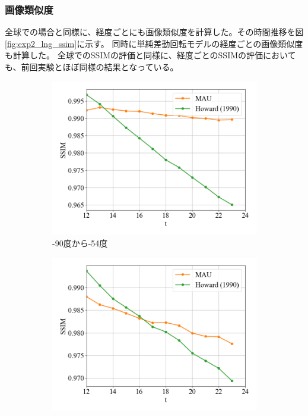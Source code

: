        \subsubsection{画像類似度}
          全球での場合と同様に、経度ごとにも画像類似度を計算した。その時間推移を図\ref{fig:exp2_lng_ssim}に示す。
          同時に単純差動回転モデルの経度ごとの画像類似度も計算した。
          全球でのSSIMの評価と同様に、経度ごとのSSIMの評価においても、前回実験とほぼ同様の結果となっている。
          \begin{figure}[htbp]
            \begin{subfigure}{0.5\textwidth}
              \centering
              \includegraphics[width=\textwidth]{figures/exp2/lng_ssim_1.png}
              \caption{-90度から-54度}
            \end{subfigure}
            \begin{subfigure}{0.5\textwidth}
              \centering
              \includegraphics[width=\textwidth]{figures/exp2/lng_ssim_2.png}

\end{subfigure}
\end{figure}
